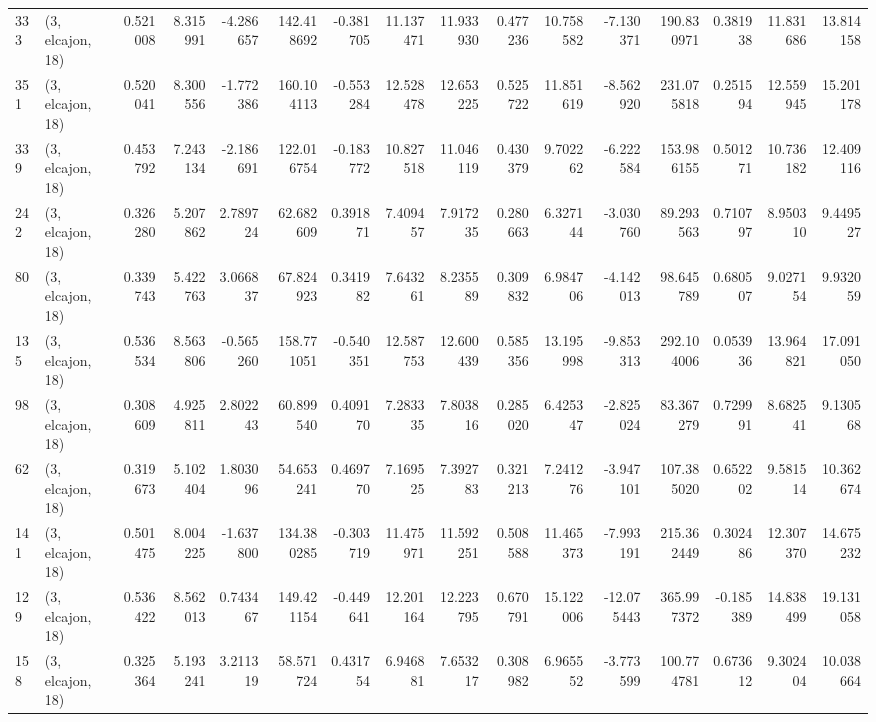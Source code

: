 \begin{tabular}{llrrrrrrrrrrrrrr}
333 &  (3, elcajon, 18) &   0.521008 &   8.315991 &  -4.286657 &   142.418692 &  -0.381705 &  11.137471 &  11.933930 &  0.477236 &  10.758582 &  -7.130371 &   190.830971 &  0.381938 &  11.831686 &  13.814158 \\
351 &  (3, elcajon, 18) &   0.520041 &   8.300556 &  -1.772386 &   160.104113 &  -0.553284 &  12.528478 &  12.653225 &  0.525722 &  11.851619 &  -8.562920 &   231.075818 &  0.251594 &  12.559945 &  15.201178 \\
339 &  (3, elcajon, 18) &   0.453792 &   7.243134 &  -2.186691 &   122.016754 &  -0.183772 &  10.827518 &  11.046119 &  0.430379 &   9.702262 &  -6.222584 &   153.986155 &  0.501271 &  10.736182 &  12.409116 \\
242 &  (3, elcajon, 18) &   0.326280 &   5.207862 &   2.789724 &    62.682609 &   0.391871 &   7.409457 &   7.917235 &  0.280663 &   6.327144 &  -3.030760 &    89.293563 &  0.710797 &   8.950310 &   9.449527 \\
80  &  (3, elcajon, 18) &   0.339743 &   5.422763 &   3.066837 &    67.824923 &   0.341982 &   7.643261 &   8.235589 &  0.309832 &   6.984706 &  -4.142013 &    98.645789 &  0.680507 &   9.027154 &   9.932059 \\
135 &  (3, elcajon, 18) &   0.536534 &   8.563806 &  -0.565260 &   158.771051 &  -0.540351 &  12.587753 &  12.600439 &  0.585356 &  13.195998 &  -9.853313 &   292.104006 &  0.053936 &  13.964821 &  17.091050 \\
98  &  (3, elcajon, 18) &   0.308609 &   4.925811 &   2.802243 &    60.899540 &   0.409170 &   7.283335 &   7.803816 &  0.285020 &   6.425347 &  -2.825024 &    83.367279 &  0.729991 &   8.682541 &   9.130568 \\
62  &  (3, elcajon, 18) &   0.319673 &   5.102404 &   1.803096 &    54.653241 &   0.469770 &   7.169525 &   7.392783 &  0.321213 &   7.241276 &  -3.947101 &   107.385020 &  0.652202 &   9.581514 &  10.362674 \\
141 &  (3, elcajon, 18) &   0.501475 &   8.004225 &  -1.637800 &   134.380285 &  -0.303719 &  11.475971 &  11.592251 &  0.508588 &  11.465373 &  -7.993191 &   215.362449 &  0.302486 &  12.307370 &  14.675232 \\
129 &  (3, elcajon, 18) &   0.536422 &   8.562013 &   0.743467 &   149.421154 &  -0.449641 &  12.201164 &  12.223795 &  0.670791 &  15.122006 & -12.075443 &   365.997372 & -0.185389 &  14.838499 &  19.131058 \\
158 &  (3, elcajon, 18) &   0.325364 &   5.193241 &   3.211319 &    58.571724 &   0.431754 &   6.946881 &   7.653217 &  0.308982 &   6.965552 &  -3.773599 &   100.774781 &  0.673612 &   9.302404 &  10.038664 \\

\end{tabular}
